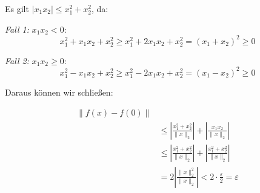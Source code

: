 \documentclass[a4paper,12pt]{article}
\begin{document}
\begin{enumerate}[label=\alph*)]
    Es gilt $|x_1 x_2| \leq x_1^2 + x_2^2$, da:

    \textit{Fall 1:} $x_1 x_2 < 0$:
    \[
        x_1^2 + x_1 x_2 + x_2^2 \geq x_1^2 + 2x_1 x_2 + x_2^2 = (x_1 + x_2)^2 \geq 0
    \]

    \textit{Fall 2:} $x_1 x_2 \geq 0$:
    \[
        x_1^2 - x_1 x_2 + x_2^2 \geq x_1^2 - 2x_1 x_2 + x_2^2 = (x_1 - x_2)^2 \geq 0
    \]

    Daraus können wir schließen:

    \begin{align*}
        \|f(x) - f(0)\| \\
        &\leq \left|\frac{x_1^2 + x_2^2}{\|x\|_2}\right| + \left|\frac{x_1 x_2}{\|x\|_2}\right| \\
        &\leq \left|\frac{x_1^2 + x_2^2}{\|x\|_2}\right| + \left|\frac{x_1^2 + x_2^2}{\|x\|_2}\right| \\
        &= 2\left|\frac{\|x\|_2^2}{\|x\|_2}\right| < 2 \cdot \frac{\varepsilon}{2} = \varepsilon
    \end{align*}

\end{enumerate}
\end{document}

